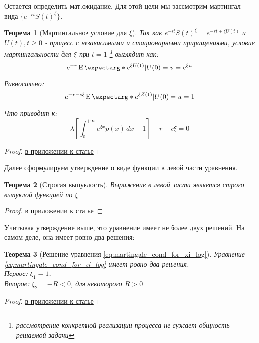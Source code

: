 \documentclass[a4paper,12pt]{article}
\newtheorem{theorem}{Теорема}
\theoremstyle{definition}
\newcommand{\proofref}[1]{\hyperlink{#1}{в приложении к статье}}
\newcommand{\expect}{\operatorname{E}\expectarg}
\begin{document}
Остается определить мат.ожидание. Для этой цели мы рассмотрим мартингал вида $\{e^{-rt}S(t)^{\xi}\}$. 
\begin{theorem}[Мартингальное условие для $\xi$]\label{thm:martingale_cond_for_xi}
Так как $e^{-rt}S(t)^{\xi} = e^{-rt + \xi U(t)}$ и ${U(t), t \ge 0}$ - процесс с независимыми и стационарными приращениями, условие мартингальности для $\xi$ при $t = 1$ \footnote{рассмотрение конкретной реализации процесса не сужает общность решаемой задачи} выглядит как:
\begin{equation}\label{eq:martingale_cond_for_xi}
e^{-r} \expect*{e^{\xi U(1)}|U(0) = u} = e ^ {\xi u}
\end{equation}

Равносильно:
\begin{equation}\label{eq:martingale_cond_for_xi_alt}
e^{-r - c\xi} \expect*{e^{\xi Z(1)}|U(0) = u} = 1
\end{equation}

Что приводит к:
\begin{equation}\label{eq:martingale_cond_for_xi_log}
\lambda \left[ \int_{0}^{+\infty} e^{\xi x} p(x) \,dx - 1  \right] - r - c \xi
 = 0
\end{equation}

\end{theorem}
\begin{proof}
\proofref{thm:martingale_cond_for_xi}
\end{proof}

Далее сформулируем утверждение о виде функции в левой части уравнения.
\begin{theorem}[Строгая выпуклость]\label{thm:strict_convexity_m1}
Выражение в левой части является строго выпуклой функцией по $\xi$
\end{theorem}
\begin{proof}
\proofref{thm:strict_convexity_m1}
\end{proof}

Учитывая утверждение выше, это уравнение имеет не более двух решений. На самом деле, она имеет ровно два решения:
\begin{theorem}[Решение уравнения \eqref{eq:martingale_cond_for_xi_log}]\label{thm:solution_for_mart_cond_m1}
Уравнение \eqref{eq:martingale_cond_for_xi_log} имеет ровно два решения. \\
Первое: $\xi_1 = 1$, \\
Второе: $\xi_2 = -R < 0$, для некоторого $R > 0$
\end{theorem}
\begin{proof}
\proofref{thm:solution_for_mart_cond_m1}
\end{proof}
\end{document}
